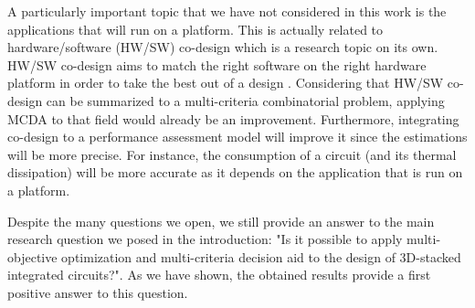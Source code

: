 A particularly important topic that we have not considered in this work is the applications that will run on a platform. This is actually related to hardware/software (HW/SW) co-design which is a research topic on its own. HW/SW co-design aims to match the right software on the right hardware platform in order to take the best out of a design \cite{abdallah2011}. Considering that HW/SW co-design can be summarized to a multi-criteria combinatorial problem, applying MCDA to that field would already be an improvement. Furthermore, integrating co-design to a performance assessment model will improve it since the estimations will be more precise. For instance, the consumption of a circuit (and its thermal dissipation) will be more accurate as it depends on the application that is run on a platform.

Despite the many questions we open, we still provide an answer to the main research question we posed in the introduction: "Is it possible to apply multi-objective optimization and multi-criteria decision aid to the design of 3D-stacked integrated circuits?". As we have shown, the obtained results provide a first positive answer to this question.